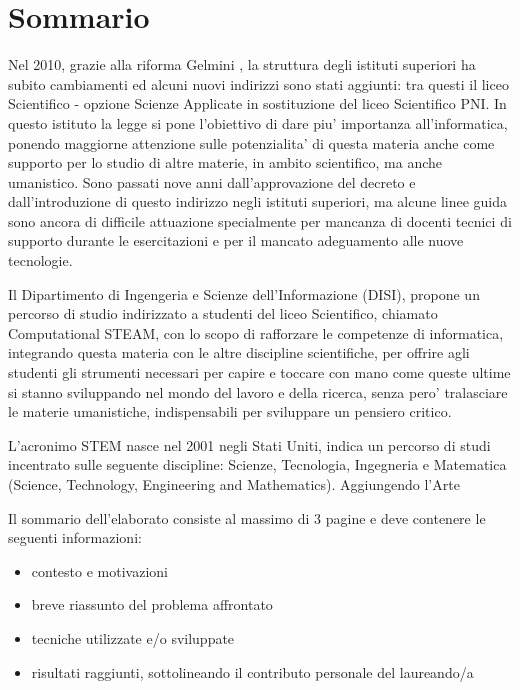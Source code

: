 \chapter*{Sommario} %
\label{sommario}


Nel 2010, grazie alla riforma Gelmini \cite{riforma}, la struttura degli istituti superiori ha subito cambiamenti ed alcuni nuovi indirizzi sono stati aggiunti: tra questi il liceo Scientifico - opzione Scienze Applicate in sostituzione del liceo Scientifico PNI. In questo istituto la legge si pone l'obiettivo di dare piu' importanza all'informatica, ponendo maggiorne attenzione sulle potenzialita' di questa materia anche come supporto per lo studio di altre materie, in ambito scientifico, ma anche umanistico. Sono passati nove anni dall'approvazione del decreto e dall'introduzione di questo indirizzo negli istituti superiori, ma alcune linee guida sono ancora di difficile attuazione specialmente per mancanza di docenti tecnici di supporto durante le esercitazioni e per il mancato adeguamento alle nuove tecnologie. 

Il Dipartimento di Ingengeria e Scienze dell'Informazione (DISI), propone un percorso di studio indirizzato a studenti del liceo Scientifico, chiamato Computational STEAM, con lo scopo di rafforzare le competenze di informatica, integrando questa materia con le altre discipline scientifiche, per offrire agli studenti gli strumenti necessari per capire e toccare con mano come queste ultime si stanno sviluppando nel mondo del lavoro e della ricerca, senza pero' tralasciare le materie umanistiche, indispensabili per sviluppare un pensiero critico.

L'acronimo STEM nasce nel 2001 negli Stati Uniti, indica un percorso di studi incentrato sulle seguente discipline: Scienze, Tecnologia, Ingegneria e Matematica (Science, Technology, Engineering and Mathematics). Aggiungendo l'Arte 

Il sommario dell’elaborato consiste al massimo di 3 pagine e deve contenere le seguenti informazioni:
\begin{itemize}
  \item contesto e motivazioni 
  \item breve riassunto del problema affrontato
  \item tecniche utilizzate e/o sviluppate
  \item risultati raggiunti, sottolineando il contributo personale del laureando/a
\end{itemize}




